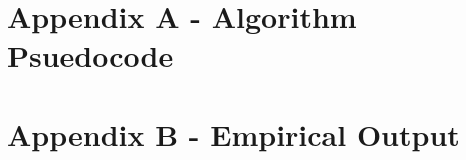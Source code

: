 \documentclass{article}
\begin{document}
\section{Appendix A - Algorithm Psuedocode}
\section{Appendix B - Empirical Output}
\end{document}

